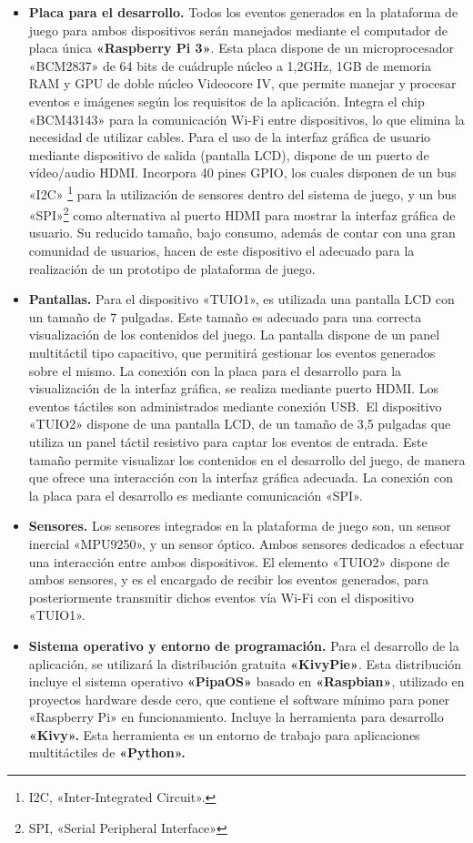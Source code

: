 \begin{itemize}
\item \textbf{Placa para el desarrollo.} Todos los eventos generados en la plataforma de juego para ambos dispositivos serán manejados mediante el computador de placa única \textbf{«Raspberry Pi 3»}. Esta placa dispone de un microprocesador «BCM2837» de 64 bits de cuádruple núcleo a 1,2GHz, 1GB de memoria RAM y GPU de doble núcleo Videocore IV, que permite manejar y procesar eventos e imágenes según los requisitos de la aplicación.
Integra el chip «BCM43143» para la comunicación Wi-Fi entre dispositivos, lo que elimina la necesidad de utilizar cables. Para el uso de la interfaz gráfica de usuario mediante dispositivo de salida (pantalla LCD), dispone de un puerto de vídeo/audio HDMI. Incorpora 40 pines GPIO, los cuales disponen de un bus «I2C» \footnote{I2C, «Inter-Integrated Circuit».} para la utilización de sensores dentro del sistema de juego, y un bus «SPI»\footnote{SPI, «Serial Peripheral Interface» } como alternativa al puerto HDMI para mostrar la interfaz gráfica de usuario.
Su reducido tamaño, bajo consumo, además de contar con una gran comunidad de usuarios, hacen de este dispositivo el adecuado para la realización de un prototipo de plataforma de juego.
\item \textbf{Pantallas.} Para el dispositivo «TUIO1», es utilizada una pantalla LCD con un tamaño de 7 pulgadas. Este tamaño es adecuado para una correcta visualización de los contenidos del juego. La pantalla dispone de un panel multitáctil tipo capacitivo, que permitirá gestionar los eventos generados sobre el mismo. La conexión con la placa para el desarrollo para la visualización de la interfaz gráfica, se realiza mediante puerto HDMI.
Los eventos táctiles son administrados mediante conexión USB.\
El dispositivo «TUIO2» dispone de una pantalla LCD, de un tamaño de 3,5 pulgadas que utiliza un panel táctil resistivo para captar los eventos de entrada. Este tamaño permite visualizar los contenidos en el desarrollo del juego, de manera que ofrece una interacción con la interfaz gráfica adecuada. La conexión con la placa para el desarrollo es mediante comunicación «SPI».
\item \textbf{Sensores.} Los sensores integrados en la plataforma de juego son, un sensor inercial «MPU9250», y un sensor óptico. Ambos sensores dedicados a efectuar una interacción entre ambos dispositivos. El elemento «TUIO2» dispone de ambos sensores, y es el encargado de recibir los eventos generados, para posteriormente transmitir dichos eventos vía Wi-Fi con el dispositivo «TUIO1».\

\item \textbf{Sistema operativo y entorno de programación.} Para el desarrollo de la aplicación, se utilizará la distribución gratuita \textbf{«KivyPie»}. Esta distribución incluye el sistema operativo \textbf{«PipaOS»} basado en \textbf{«Raspbian»}, utilizado en proyectos hardware desde cero, que contiene el software mínimo para poner «Raspberry Pi» en funcionamiento. Incluye la herramienta para desarrollo \textbf{«Kivy».} Esta herramienta es un entorno de trabajo para aplicaciones multitáctiles de \textbf{«Python».}
\end{itemize}


